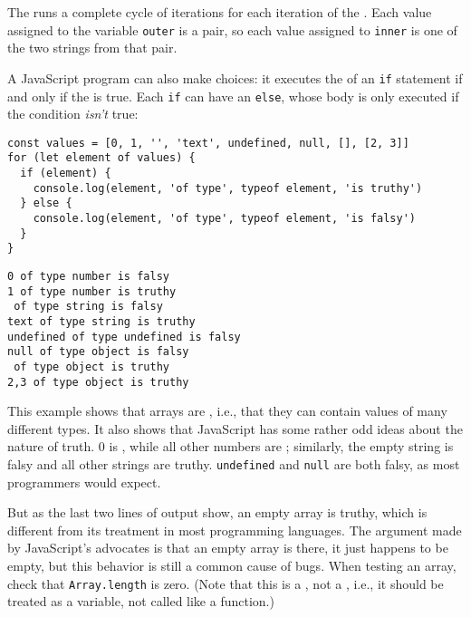 The  runs a complete cycle of iterations
for each iteration of the .
Each value assigned to the variable \texttt{outer} is a pair,
so each value assigned to \texttt{inner} is one of the two strings from that pair.


A JavaScript program can also make choices:
it executes the  of an \texttt{if} statement
if and only if the  is true.
Each \texttt{if} can have an \texttt{else},
whose body is only executed if the condition \emph{isn't} true:

\begin{verbatim}
const values = [0, 1, '', 'text', undefined, null, [], [2, 3]]
for (let element of values) {
  if (element) {
    console.log(element, 'of type', typeof element, 'is truthy')
  } else {
    console.log(element, 'of type', typeof element, 'is falsy')
  }
}
\end{verbatim}

\begin{verbatim}
0 of type number is falsy
1 of type number is truthy
 of type string is falsy
text of type string is truthy
undefined of type undefined is falsy
null of type object is falsy
 of type object is truthy
2,3 of type object is truthy
\end{verbatim}

This example shows that arrays are ,
i.e.,
that they can contain values of many different types.
It also shows that JavaScript has some rather odd ideas about the nature of truth.
0 is , while all other numbers are ;
similarly,
the empty string is falsy and all other strings are truthy.
\texttt{undefined} and \texttt{null} are both falsy,
as most programmers would expect.

But as the last two lines of output show,
an empty array is truthy,
which is different from its treatment in most programming languages.
The argument made by JavaScript's advocates is that an empty array is there,
it just happens to be empty,
but this behavior is still a common cause of bugs.
When testing an array,
check that \texttt{Array.length} is zero.
(Note that this is a ,
not a ,
i.e.,
it should be treated as a variable,
not called like a function.)

